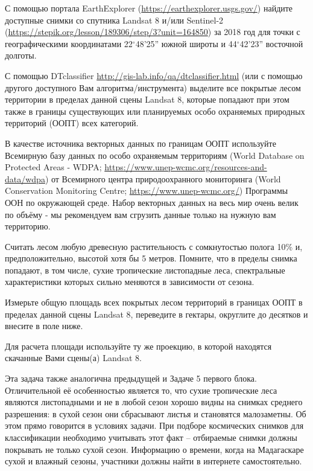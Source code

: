 
С помощью портала EarthExplorer (\url{https://earthexplorer.usgs.gov/}) найдите доступные снимки со спутника 
Landsat 8 и/или Sentinel-2 (\url{https://stepik.org/lesson/189306/step/3?unit=164850}) за 2018 год 
для точки с географическими координатами 22$^{\circ}$48'25'' южной широты и 44$^{\circ}$42'23'' восточной долготы.

С помощью DTclassifier \url{http://gis-lab.info/qa/dtclassifier.html} (или с помощью другого доступного Вам алгоритма/инструмента) выделите все покрытые лесом территории в пределах данной сцены Landsat 8, которые попадают при этом также в границы существующих или планируемых особо охраняемых природных территорий (ООПТ) всех категорий.

В качестве источника векторных данных по границам ООПТ используйте Всемирную базу 
данных по особо охраняемым территориям (World Database on Protected Areas - WDPA; \url{https://www.unep-wcmc.org/resources-and-data/wdpa}) от 
Всемирного центра природоохранного мониторинга (World Conservation Monitoring Centre; \url{https://www.unep-wcmc.org/}) Программы ООН по окружающей среде. Набор векторных данных на весь мир очень велик по объёму - мы рекомендуем вам сгрузить данные только на нужную вам территорию. 

Считать лесом любую древесную растительность с сомкнутостью полога 10\% и, предположительно, высотой хотя бы 5 метров. Помните, что в пределы снимка попадают, в том числе, сухие тропические листопадные леса, спектральные характеристики которых сильно меняются в зависимости от сезона.

Измерьте общую площадь всех покрытых лесом территорий в границах ООПТ в пределах данной сцены 
Landsat 8, переведите в гектары, округлите до десятков и внесите в поле ниже. 

Для расчета площади используйте ту же проекцию, в которой находятся скачанные Вами сцены(а) Landsat 8.

\explanationSection

Эта задача также аналогична предыдущей и Задаче 5 первого блока. Отличительной её особенностью является то, что сухие тропические леса являются листопадными и не в любой сезон хорошо видны на снимках среднего разрешения: в сухой сезон они сбрасывают листья и становятся малозаметны. Об этом прямо говорится в условиях задачи. При подборе космических снимков для классификации необходимо учитывать этот факт – отбираемые снимки должны покрывать не только сухой сезон. Информацию о времени, когда на Мадагаскаре сухой и влажный сезоны, участники должны найти в интернете самостоятельно.

